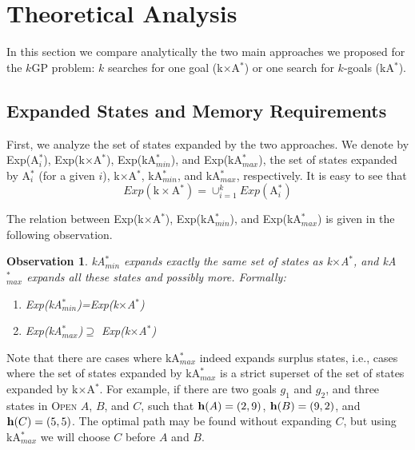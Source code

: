 \documentclass{aicom2e}
\newtheorem{observation}{Observation}
\newcommand{\kgs}{$k$GP}
\newcommand{\kastar}{kA$^*$}
\newcommand{\kastarmin}{kA$^*_{min}$}
\newcommand{\kastarmax}{kA$^*_{max}$}
\newcommand{\kxastar}{k$\times$A$^*$}
\newcommand{\astari}[1]{A$^*_#1$}
\newcommand{\open}{\textsc{Open}}
\newcommand{\roni}[1]{\textbf{[RS:#1]}}
\begin{document}
\section{Theoretical Analysis}
\label{sec:theoretical-analysis}

In this section we compare analytically the two main approaches we proposed for
the \kgs{} problem: $k$ searches for one goal (\kxastar{}) or one search for
$k$-goals (\kastar{}).

\subsection{Expanded States and Memory Requirements}
First, we analyze the set of states expanded by the two approaches.
We denote by Exp(\astari{i}), Exp(\kxastar{}), Exp(\kastarmin), and Exp(\kastarmax),
the set of states expanded by \astari{i} (for a given $i$), \kxastar{}, \kastarmin, and \kastarmax{}, respectively. It is easy to see that
\[ Exp(\text{\kxastar{}})=\cup_{i=1}^k Exp(\text{\astari{i}}) \]

The relation between Exp(\kxastar{}), Exp(\kastarmin), and Exp(\kastarmax) is given in the following observation.
\begin{observation}
    \kastarmin{} expands exactly the same set of states as \kxastar{},
    and \kastarmax{} expands all these states and possibly more. Formally:
    \begin{enumerate}
        \item Exp(\kastarmin{})=Exp(\kxastar{})
        \item Exp(\kastarmax{})$\supseteq$ Exp(\kxastar{})
    \end{enumerate}
\label{obs:expandedStates}
\end{observation}

Note that there are cases where \kastarmax{} indeed expands surplus states,
i.e., cases where the set of states
expanded by \kastarmax{} is a strict superset of the set of states expanded by
\kxastar{}. For example, if there are two goals $g_1$ and $g_2$, and three
states in \open{} $A$, $B$, and $C$, such that ${\bf h}(A)=(2,9)$, ${\bf
h}(B)=(9,2)$, and ${\bf h}(C)=(5,5)$. The optimal path may be found without
expanding $C$, but using \kastarmax{} we will choose $C$ before $A$ and $B$.


\end{document}
